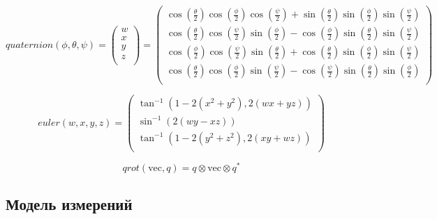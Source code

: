 \documentclass[11pt,a4paper]{article}
\begin{document}
\begin{equation}
    \label{eq:quaternion}
    quaternion(\phi ,\theta ,\psi )=\left(
    \begin{array}{c}
    w \\
    x \\
    y \\
    z \\
    \end{array}
    \right)=\left(
    \begin{array}{c}
    \cos \left(\frac{\theta }{2}\right) \cos \left(\frac{\phi }{2}\right) \cos \left(\frac{\psi }{2}\right)+\sin \left(\frac{\theta }{2}\right) \sin \left(\frac{\phi }{2}\right) \sin \left(\frac{\psi }{2}\right) \\
    \cos \left(\frac{\theta }{2}\right) \cos \left(\frac{\psi }{2}\right) \sin \left(\frac{\phi }{2}\right)-\cos \left(\frac{\phi }{2}\right) \sin \left(\frac{\theta }{2}\right) \sin \left(\frac{\psi }{2}\right) \\
    \cos \left(\frac{\phi }{2}\right) \cos \left(\frac{\psi }{2}\right) \sin \left(\frac{\theta }{2}\right)+\cos \left(\frac{\theta }{2}\right) \sin \left(\frac{\phi }{2}\right) \sin \left(\frac{\psi }{2}\right) \\
    \cos \left(\frac{\theta }{2}\right) \cos \left(\frac{\phi }{2}\right) \sin \left(\frac{\psi }{2}\right)-\cos \left(\frac{\psi }{2}\right) \sin \left(\frac{\theta }{2}\right) \sin \left(\frac{\phi }{2}\right) \\
    \end{array}
    \right)
\end{equation}

\begin{equation}
    \label{eq:euler}
    euler(w,x,y,z)=\left(
    \begin{array}{c}
    \tan ^{-1}\left(1-2 \left(x^2+y^2\right),2 (w x+y z)\right) \\
    \sin ^{-1}(2 (w y-x z)) \\
    \tan ^{-1}\left(1-2 \left(y^2+z^2\right),2 (x y+w z)\right) \\
    \end{array}
    \right)
\end{equation}

\begin{equation}
    \label{eq:qrot}
    qrot(\text{vec},q)=q\otimes \text{vec}\otimes q^*
\end{equation}

\subsection{Модель измерений}
\end{document}
